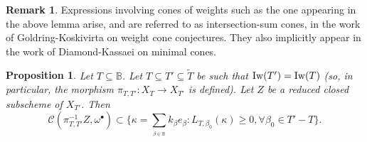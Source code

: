 \documentclass[11pt,pdflatex]{amsart}
\theoremstyle{plain}
\theoremstyle{definition}
\newtheorem{remark}[theorem]{Remark}
\theoremstyle{plain}
\newtheorem{prop}[theorem]{Proposition}
\theoremstyle{definition}
\theoremstyle{remark}
\numberwithin{equation}{section}
\numberwithin{figure}{section} \numberwithin{table}{subsection}
\newcommand{\calC}{{\mathcal{C}}}
\def\BB{\mathbb{B}}
\begin{document}
\begin{remark} Expressions involving cones of weights such as the one appearing in the above lemma arise, and are referred to as intersection-sum cones, in the work of Goldring-Koskivirta on weight cone conjectures. They also implicitly appear in the work of Diamond-Kassaei on minimal cones.
\end{remark}

 \begin{prop} \label{prop: O(1)} Let $T \subseteq \BB$. Let $T \subseteq T'\subseteq   \tilde{T}$ be such that  ${\rm Iw}(T')={\rm Iw}(T)$ (so, in particular, the morphism $\pi_{T,T'}: X_T \rightarrow X_{T'}$ is defined). Let $Z$ be a reduced closed subscheme of $X_{T'}$.  Then
$$\calC(\pi_{T,T'}^{-1}Z ,\omega^\bullet)  \subset \{\kappa=\sum_{_{\beta \in \BB}} k_\beta e_\beta : L_{T,\beta_0}(\kappa) \geq 0,  \forall \beta_0 \in T'-T\}.$$
\end{prop}
\end{document}
